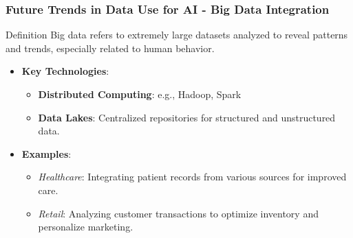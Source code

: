 \documentclass[aspectratio=169]{beamer}
\begin{document}
\begin{frame}[fragile]
    \frametitle{Future Trends in Data Use for AI - Big Data Integration}
    \begin{block}{Definition}
        Big data refers to extremely large datasets analyzed to reveal patterns and trends, especially related to human behavior.
    \end{block}
    \begin{itemize}
        \item \textbf{Key Technologies}:
        \begin{itemize}
            \item \textbf{Distributed Computing}: e.g., Hadoop, Spark
            \item \textbf{Data Lakes}: Centralized repositories for structured and unstructured data.
        \end{itemize}
        \item \textbf{Examples}:
        \begin{itemize}
            \item \textit{Healthcare}: Integrating patient records from various sources for improved care.
            \item \textit{Retail}: Analyzing customer transactions to optimize inventory and personalize marketing.
        \end{itemize}
    \end{itemize}
\end{frame}
\end{document}
